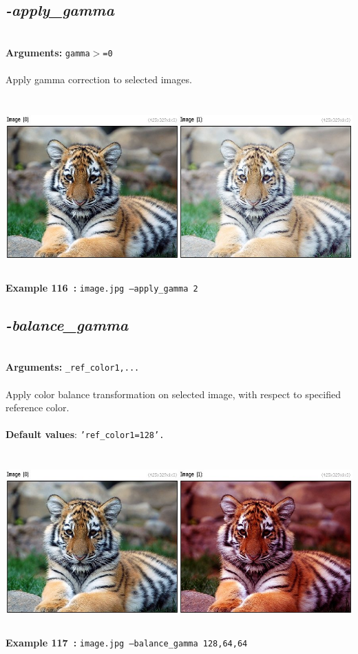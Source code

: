 \documentclass[a4paper,11pt,twoside]{book}
\begin{document}
\subsection{\emph{-apply\_gamma} }\vspace*{-0.5em}
~\\\textbf{Arguments: } 
{\small \texttt{gamma$>$=0}}\\~\\
Apply gamma correction to selected images.
\begin{center}\includegraphics[keepaspectratio=true,height=7cm,width=\textwidth]{img/gmic_def116.jpg}\\
{\footnotesize \textbf{Example 116~:} \texttt{image.jpg --apply\_gamma 2}}
\end{center}

\subsection{\emph{-balance\_gamma} }\vspace*{-0.5em}
~\\\textbf{Arguments: } 
{\small \texttt{\_ref\_color1,...}}\\~\\
Apply color balance transformation on selected image, with respect to specified reference color.
~\\~\\\textbf{Default values}: {\small \texttt{'ref\_color1=128'.}}
\begin{center}\includegraphics[keepaspectratio=true,height=7cm,width=\textwidth]{img/gmic_def117.jpg}\\
{\footnotesize \textbf{Example 117~:} \texttt{image.jpg --balance\_gamma 128,64,64}}
\end{center}
\end{document}
